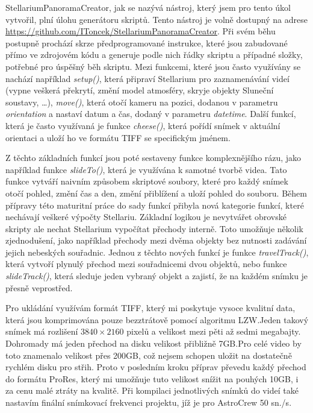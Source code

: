 \documentclass[12pt,a4paper,titlepage]{article}
\begin{document}
StellariumPanoramaCreator, jak se nazývá nástroj, který jsem pro tento úkol vytvořil, plní úlohu generátoru skriptů. Tento nástroj je volně dostupný na adrese \url{https://github.com/IToncek/StellariumPanoramaCreator}. Při svém běhu postupně prochází skrze předprogramované instrukce, které jsou zabudované přímo ve zdrojovém kódu a generuje podle nich řádky skriptu a případné složky, potřebné pro úspěšný běh skriptu. Mezi funkcemi, které jsou často využívány se nachází například \textit{setup()}, která připraví Stellarium pro zaznamenávání videí (vypne veškerá překrytí, změní model atmosféry, skryje objekty Sluneční soustavy, \ldots), \textit{move()}, která otočí kameru na pozici, dodanou v parametru \textit{orientation} a nastaví datum a čas, dodaný v parametru \textit{datetime}. Další funkcí, která je často využívaná je funkce \textit{cheese()}, která pořídí snímek v aktuální orientaci a uloží ho ve formátu TIFF se specifickým jménem. %

Z těchto základních funkcí jsou poté sestaveny funkce komplexnějšího rázu, jako například funkce \textit{slideTo()}, která je využívána k samotné tvorbě videa. Tato funkce vytváří naivním způsobem skriptové soubory, které pro každý snímek otočí pohled, změní čas a den, změní přiblížení a uloží pohled do souboru. Během přípravy této maturitní práce do sady funkcí přibyla nová kategorie funkcí, které nechávají veškeré výpočty Stellariu. Základní logikou je nevytvářet obrovské skripty ale nechat Stellarium vypočítat přechody interně. Toto umožňuje několik zjednodušení, jako například přechody mezi dvěma objekty bez nutnosti zadávání jejich nebeských souřadnic. Jednou z těchto nových funkcí je funkce \textit{travelTrack()}, která vytvoří plynulý přechod mezi souřadnicemi dvou objektů, nebo funkce \textit{slideTrack()}, která sleduje jeden vybraný objekt a zajistí, že na každém snímku je přesně veprostřed. %

Pro ukládání využívám formát TIFF, který mi poskytuje vysoce kvalitní data, která jsou komprimována pouze bezztrátově pomocí algoritmu LZW.\@ Jeden takový snímek má rozlišení \(3840\times2160\) pixelů a velikost mezi pěti až sedmi megabajty. Dohromady má jeden přechod na disku velikost přibližně 7GB.\@ Pro celé video by toto znamenalo velikost přes 200GB, což nejsem schopen uložit na dostatečně rychlém disku pro střih. Proto v posledním kroku příprav převedu každý přechod do formátu ProRes, který mi umožňuje tuto velikost snížit na pouhých 10GB, i za cenu malé ztráty na kvalitě. Při kompilaci jednotlivých snímků do videí také nastavím finální snímkovací frekvenci projektu, jíž je pro AstroCrew 50 sn./s.
\end{document}
